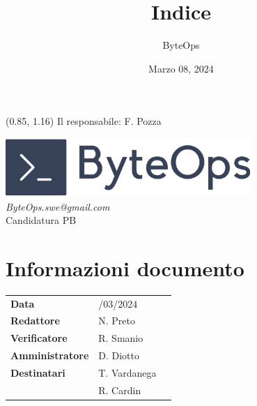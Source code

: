 \documentclass{article}
\title{\textbf{\fontsize{28}{6}\selectfont Indice}}
\author{\fontsize{14}{6}\selectfont ByteOps}
\date{Marzo 08, 2024}
\begin{document}
\begin{textblock*}{\textwidth}(0.85\textwidth, 1.16\textheight)
    Il responsabile: F. Pozza
\end{textblock*}

\pagestyle{fancy}
\begin{center}
\includegraphics[width = 0.7\textwidth]{Images/logo.png} \\
\vspace{0.2cm}
\textcolor[RGB]{60, 60, 60}{\textit{ByteOps.swe@gmail.com}} \\
\vspace{1cm}
\fontsize{16}{6}\selectfont Candidatura PB \\
\vspace{0.5cm}
\end{center}

\section*{Informazioni documento}
\def\arraystretch{1.2}
\begin{tabular}{>{\raggedleft\arraybackslash}p{}|>{\raggedright\arraybackslash}p{}c}
\hline
\addlinespace
\textbf{Data} & 08/03/2024 \vspace{10pt} \\
\textbf{Redattore} & N. Preto \vspace{10pt} \\
\textbf{Verificatore} & R. Smanio \vspace{10pt} \\
\textbf{Amministratore} & D. Diotto \vspace{10pt} \\
\textbf{Destinatari} & T. Vardanega \\ & R. Cardin \vspace{10pt} \\
\end{tabular}
\pagebreak 

\maketitle
\thispagestyle{fancy}
{
    \hypersetup{linkcolor=black}
    \tableofcontents
}
\pagebreak
\end{document}
